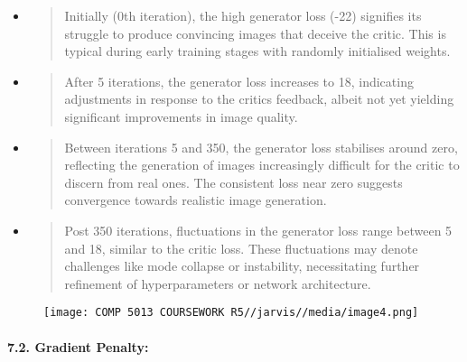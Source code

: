 \documentclass[
]{article}
\begin{document}
\begin{itemize}
\item
  \begin{quote}
  Initially (0th iteration), the high generator loss (-22) signifies its
  struggle to produce convincing images that deceive the critic. This is
  typical during early training stages with randomly initialised
  weights.
  \end{quote}
\item
  \begin{quote}
  After 5 iterations, the generator loss increases to 18, indicating
  adjustments in response to the critic\textquotesingle s feedback,
  albeit not yet yielding significant improvements in image quality.
  \end{quote}
\item
  \begin{quote}
  Between iterations 5 and 350, the generator loss stabilises around
  zero, reflecting the generation of images increasingly difficult for
  the critic to discern from real ones. The consistent loss near zero
  suggests convergence towards realistic image generation.
  \end{quote}
\item
  \begin{quote}
  Post 350 iterations, fluctuations in the generator loss range between
  5 and 18, similar to the critic loss. These fluctuations may denote
  challenges like mode collapse or instability, necessitating further
  refinement of hyperparameters or network architecture.
  \end{quote}
\end{itemize}

\begin{figure}
    \centering
    \texttt{[image: COMP 5013 COURSEWORK R5//jarvis//media/image4.png]}


\end{figure}

\hypertarget{section}{%
\paragraph{}\label{section}}

\hypertarget{section-1}{%
\paragraph{}\label{section-1}}

\hypertarget{gradient-penalty}{%
\paragraph{\texorpdfstring{\textbf{7.2. Gradient
Penalty:}}{7.2. Gradient Penalty:}}\label{gradient-penalty}}
\end{document}

